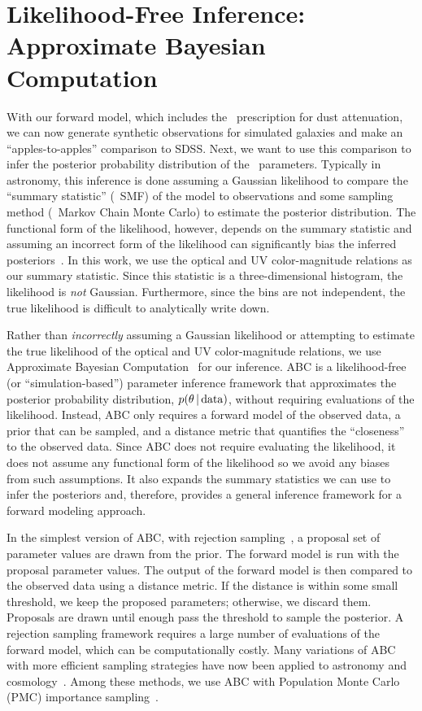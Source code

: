 \section{Likelihood-Free Inference: Approximate Bayesian Computation} \label{sec:abc}
With our forward model, which includes the \eda~prescription for dust
attenuation, we can now generate synthetic observations for simulated
galaxies and make an ``apples-to-apples'' comparison to SDSS. Next, we want
to use this comparison to infer the posterior probability distribution of
the \eda~parameters. Typically in astronomy, this inference is done
assuming a Gaussian likelihood to compare the ``summary statistic''
(\eg~SMF) of the model to observations and some sampling method (\eg~Markov
Chain Monte Carlo) to estimate the posterior distribution. The functional form of the
likelihood, however, depends on the summary statistic and assuming an
incorrect form of the likelihood can significantly bias the inferred
posteriors~\citep[\eg][]{hahn2019}. In this work, we use the optical and UV
color-magnitude relations as our summary statistic. Since this statistic is
a three-dimensional histogram, the likelihood is {\em not} Gaussian.
Furthermore, since the bins are not independent, the true likelihood is
difficult to analytically write down.

Rather than \emph{incorrectly} assuming a Gaussian likelihood or attempting
to estimate the true likelihood of the optical and UV color-magnitude
relations, we use Approximate Bayesian Computation~\citep[hereafter
ABC;][]{diggle1984, tavare1997, pritchard1999, beaumont2009, delmoral2012}
for our inference. 
ABC is a likelihood-free (or ``simulation-based'') parameter inference
framework that approximates the posterior probability distribution, $p(\theta\,|\,{\rm data})$, without
requiring evaluations of the likelihood.  Instead, ABC only requires a forward
model of the observed data, a prior that can be sampled, and a distance metric
that quantifies the ``closeness'' to the observed data. 
Since ABC does not require evaluating the likelihood, it does not assume
any functional form of the likelihood so we avoid any biases from such
assumptions. 
It also expands the summary statistics we can use to infer the posteriors and,
therefore, provides a general inference framework for a forward modeling 
approach. 

In the simplest version of ABC, with rejection sampling~\citep{pritchard1999}, a proposal set of parameter values are drawn
from the prior. The forward model is run with the proposal parameter values.
The output of the forward model is then compared to the observed data using
a distance metric. 
If the distance is within some small threshold, we keep the proposed
parameters; otherwise, we discard them.  Proposals are
drawn until enough pass the threshold to sample the posterior. A
rejection sampling framework requires a large number of evaluations of the
forward model, which
can be computationally costly. Many variations of ABC with more efficient
sampling strategies have now been applied to astronomy and
cosmology~\citep[\eg][]{cameron2012, weyant2013, ishida2015, lin2016, alsing2018}.
Among these methods, we use ABC with Population Monte Carlo (PMC) 
importance sampling~\citep{hahn2017a, hahn2017b, hahn2019a}.

